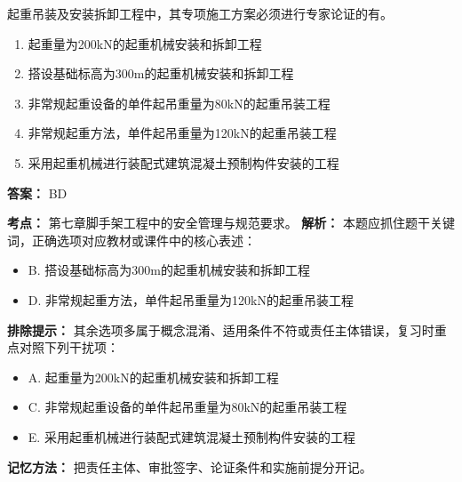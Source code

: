 \documentclass[UTF8,fontset=fandol,11pt]{ctexart}
\begin{document}
\begin{quizbox}[title={第 6 题}]
起重吊装及安装拆卸工程中，其专项施工方案必须进行专家论证的有。\\
\begin{enumerate}[label=\Alph*.]
\item 起重量为200kN的起重机械安装和拆卸工程
\item 搭设基础标高为300m的起重机械安装和拆卸工程
\item 非常规起重设备的单件起吊重量为80kN的起重吊装工程
\item 非常规起重方法，单件起吊重量为120kN的起重吊装工程
\item 采用起重机械进行装配式建筑混凝土预制构件安装的工程
\end{enumerate}
\textbf{答案：} BD
\vspace{0.25em}
\begin{answerbox}[title={考点解析}]
\textbf{考点：} 第七章脚手架工程中的安全管理与规范要求。
\textbf{解析：} 本题应抓住题干关键词，正确选项对应教材或课件中的核心表述：
\begin{itemize}
\item B. 搭设基础标高为300m的起重机械安装和拆卸工程
\item D. 非常规起重方法，单件起吊重量为120kN的起重吊装工程
\end{itemize}
\textbf{排除提示：} 其余选项多属于概念混淆、适用条件不符或责任主体错误，复习时重点对照下列干扰项：
\begin{itemize}
\item A. 起重量为200kN的起重机械安装和拆卸工程
\item C. 非常规起重设备的单件起吊重量为80kN的起重吊装工程
\item E. 采用起重机械进行装配式建筑混凝土预制构件安装的工程
\end{itemize}
\textbf{记忆方法：} 把责任主体、审批签字、论证条件和实施前提分开记。
\end{answerbox}
\end{quizbox}
\end{document}
